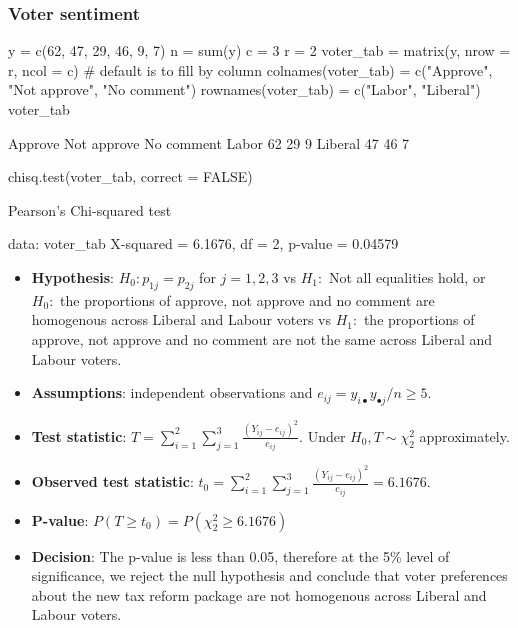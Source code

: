 \documentclass[a4paper]{article}
\begin{document}
\subsubsection{Voter sentiment}
\begin{Schunk}
\begin{Sinput}
y = c(62, 47, 29, 46, 9, 7)
n = sum(y)
c = 3
r = 2
voter_tab = matrix(y, nrow = r, ncol = c)  
# default is to fill by column
colnames(voter_tab) = c("Approve", 
                        "Not approve",
                        "No comment")
rownames(voter_tab) = c("Labor", "Liberal")
voter_tab
\end{Sinput}
\begin{Soutput}
        Approve Not approve No comment
Labor        62          29          9
Liberal      47          46          7
\end{Soutput}
\begin{Sinput}
chisq.test(voter_tab, correct = FALSE)
\end{Sinput}
\begin{Soutput}

	Pearson's Chi-squared test

data:  voter_tab
X-squared = 6.1676, df = 2, p-value = 0.04579
\end{Soutput}
\end{Schunk}
\begin{itemize}
	\item \textbf{Hypothesis}: \( H_0: p_{1j} = p_{2j} \) for \( j = 1,2,3 \) vs \( H_1: \) Not all equalities hold, or \( H_0: \)  the proportions of approve, not approve and no comment are homogenous across Liberal and Labour voters vs \( H_1: \)  the proportions of approve, not approve and no comment are not the same across Liberal and Labour voters.
	\item \textbf{Assumptions}: independent observations and \( e_{ij} =y_{i \bullet} y_{\bullet j}/n \geq 5 \).
	\item \textbf{Test statistic}: \( T = \sum\limits_{i=1}^{2}\sum\limits_{j=1}^{3} \frac{(Y_{ij} - e_{ij})^2}{e_{ij}} \). Under \( H_0, T \sim \chi^2_2 \) approximately.
	\item \textbf{Observed test statistic}: \( t_0 = \sum\limits_{i=1}^{2}\sum\limits_{j=1}^{3} \frac{(Y_{ij} - e_{ij})^2}{e_{ij}} = 6.1676 \).
	\item \textbf{P-value}: \( P(T \geq t_0) = P(\chi^2_2 \geq 6.1676) \)
	\item \textbf{Decision}: The p-value is less than 0.05, therefore at the 5\% level of significance, we reject the null hypothesis and conclude that voter preferences about the new tax reform package are not homogenous across Liberal and Labour voters.
\end{itemize}
\end{document}
